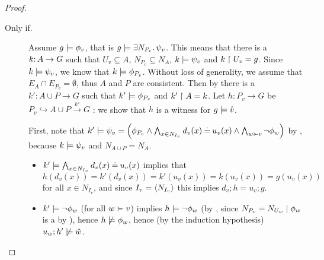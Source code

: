 \begin{proof}
\begin{description}
\smallskip
\item[Only if.] Assume $g\models \phi_v$, that is $g \models \exists N_{P_v}.\, \psi_v$. This means that 
there is a $k{:}\, A\rightarrow G$ such that $U_v \subseteq A$, $N_{P_v} \subseteq N_A$, $k \models \psi_v$ and $k\restriction U_v = g$. Since  $k \models \psi_v$, we know that $k \models \phi_{P_v}$. Without loss of generality, we assume that $E_A \cap E_{P_v} = \emptyset$, thus $A$ and $P$ are consistent. 
Then by  there is a $k':A \cup P \to G$ such that $k' \models \phi_{P_v}$ and $k'\restriction A = k$. Let $h: P_v \to G$ be $P_v \hookrightarrow A \cup P \stackrel{k'}{\to} G$ : we show that $h$ is a witness for $g \models \hat v$.


First, note that $k'\sat \psi_v = \left( \phi_{P_v}\wedge \bigwedge_{x\in N_{I_v}} d_v(x)\Eq u_v(x) \wedge \bigwedge_{w\childof v} \neg\phi_w \right)$ by , because $k\models \psi_v$ and $N_{A\cup P}=N_A$. 
\begin{itemize}

\item $k'\models \bigwedge_{x\in N_{I_v}} d_v(x)\mathbin{\doteq} u_v(x)$ implies that $h(d_v(x))=k'(d_v(x))=k'(u_v(x))= k(u_v(x)) = g(u_v(x))$ for all $x\in N_{I_v}$, and since $I_v=\langle N_{I_v}\rangle$ this implies $d_v;h=u_v;g$.

\item $k'\models \neg\phi_w$ (for all $w\childof v$) implies $h\models\neg\phi_w$ (by , since ${N_{P_v} = N_{U_w}} \mid {\phi_w}$ is a {\cfor} by ), hence $h\not\models\phi_w$, hence (by the induction hypothesis) $u_w;h'\not\models \hat w$.

\end{itemize}





\end{description}
\end{proof}
